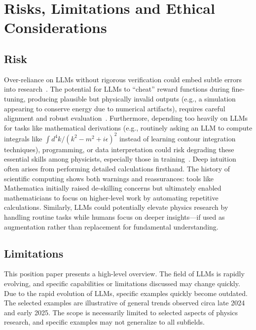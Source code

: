 \appendix
\section{Risks, Limitations and Ethical Considerations}
\label{sec:risks_challenges}
\subsection*{Risk}
Over-reliance on LLMs without rigorous verification could embed subtle errors into research~\cite{Zhang2023Sirens}. The potential for LLMs to ``cheat'' reward functions during fine-tuning, producing plausible but physically invalid outputs (e.g., a simulation appearing to conserve energy due to numerical artifacts), requires careful alignment and robust evaluation~\cite{Bengio2024Managing,Anwar2024Foundational}.
Furthermore, depending too heavily on LLMs for tasks like mathematical derivations (e.g., routinely asking an LLM to compute integrals like $\int d^4k / (k^2-m^2+i\epsilon)^2$ instead of learning contour integration techniques), programming, or data interpretation could risk degrading these essential skills among physicists, especially those in training~\cite{Bender2020Climbing}. Deep intuition often arises from performing detailed calculations firsthand.
The history of scientific computing shows both warnings and reassurances: tools like Mathematica initially raised de-skilling concerns but ultimately enabled mathematicians to focus on higher-level work by automating repetitive calculations. Similarly, LLMs could potentially elevate physics research by handling routine tasks while humans focus on deeper insights---if used as augmentation rather than replacement for fundamental understanding.

\subsection*{Limitations}
\label{sec:limitations}
This position paper presents a high-level overview. The field of LLMs is rapidly evolving, and specific capabilities or limitations discussed may change quickly.
Due to the rapid evolution of LLMs, specific examples quickly become outdated. The selected examples are illustrative of general trends observed circa late 2024 and early 2025. The scope is necessarily limited to selected aspects of physics research, and specific examples may not generalize to all subfields.
